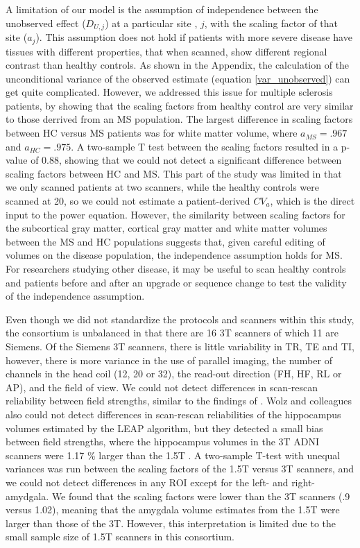 A limitation of our model is the assumption of independence between the unobserved effect ($D_{U,j}$) at a particular site , $j$, with the scaling factor of that site ($a_j$). This assumption does not hold if patients with more severe disease have tissues with different properties, that when scanned, show different regional contrast than healthy controls. As shown in the Appendix, the calculation of the unconditional variance of the observed estimate (equation \ref{var_unobserved}) can get quite complicated. However, we addressed this issue for multiple sclerosis patients, by showing that the scaling factors from healthy control are very similar to those derrived from an MS population. The largest difference in scaling factors between HC versus MS patients was for white matter volume, where $a_{MS} = .967$ and $a_{HC} = .975$. A two-sample T test between the scaling factors resulted in a p-value of $0.88$, showing that we could not detect a significant difference between scaling factors between HC and MS. This part of the study was limited in that we only scanned patients at two scanners, while the healthy controls were scanned at 20, so we could not estimate a patient-derived $CV_a$, which is the direct input to the power equation. However, the similarity between scaling factors for the subcortical gray matter, cortical gray matter and white matter volumes between the MS and HC populations suggests that, given careful editing of volumes on the disease population, the independence assumption holds for MS. For researchers studying other disease, it may be useful to scan healthy controls and patients before and after an upgrade or sequence change to test the validity of the independence assumption.

Even though we did not standardize the protocols and scanners within this study, the consortium is unbalanced in that there are 16 3T scanners of which 11 are Siemens. Of the Siemens 3T scanners, there is little variability in TR, TE and TI, however, there is more variance in the use of parallel imaging, the number of channels in the head coil (12, 20 or 32), the read-out direction (FH, HF, RL or AP), and the field of view. We could not detect differences in scan-rescan reliability between field strengths, similar to the findings of \cite{Jovicich_2009}. Wolz and colleagues also could not detect differences in scan-rescan reliabilities of the hippocampus volumes estimated by the LEAP algorithm, but they detected a small bias between field strengths, where the hippocampus volumes in the 3T ADNI scanners were 1.17 \% larger than the 1.5T \cite{Wolz_2014}. A two-sample T-test with unequal variances was run between the scaling factors of the 1.5T versus 3T scanners, and we could not detect differences in any ROI except for the left- and right- amydgala. We found that the scaling factors were lower than the 3T scanners (.9 versus 1.02), meaning that the amygdala volume estimates from the 1.5T were larger than those of the 3T. However, this interpretation is limited due to the small sample size of 1.5T scanners in this consortium.  